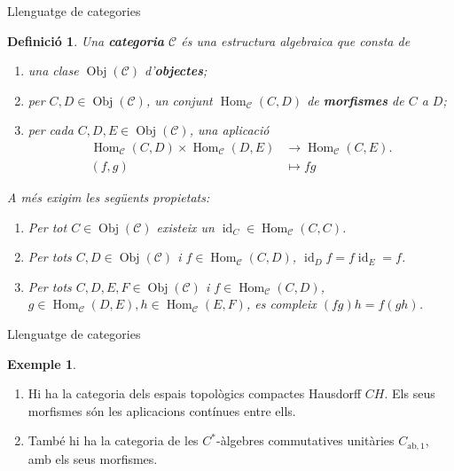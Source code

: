 \documentclass{beamer}
\newtheorem{definicio}{Definici\'{o}}
\theoremstyle{definition}
\newtheorem{exemple}{Exemple}
\DeclareMathOperator{\Obj}{Obj}
\DeclareMathOperator{\Hom}{Hom}
\DeclareMathOperator{\id}{id}
\begin{document}
\begin{frame}{Llenguatge de categories}
\begin{definicio}
Una \textbf{categoria} $\mathcal{C}$ \'{e}s una estructura algebraica que consta de
\begin{enumerate}
\item una clase $\Obj(\mathcal{C})$ d'\textbf{objectes};
\item per $C,D\in\Obj(\mathcal{C})$, un conjunt $\Hom_{\mathcal{C}}(C,D)$ de \textbf{morfismes} de $C$ a $D$;
\item per cada $C,D,E\in\Obj(\mathcal{C})$, una aplicaci\'{o}
\begin{align*}
\Hom_{\mathcal{C}}(C,D)\times\Hom_{\mathcal{C}}(D,E)&\longrightarrow\Hom_{\mathcal{C}}(C,E).\\
(f,g)&\longmapsto fg
\end{align*}
\end{enumerate}
\pause

A m\'{e}s exigim les seg\"{u}ents propietats:
\begin{enumerate}
\item Per tot $C\in\Obj(\mathcal{C})$ existeix un $\id_C\in\Hom_{\mathcal{C}}(C,C)$.
\item Per tots $C,D\in\Obj(\mathcal{C})$ i $f\in\Hom_{\mathcal{C}}(C,D)$, $\id_Df=f\id_E=f$.
\item Per tots $C,D,E,F\in\Obj(\mathcal{C})$ i $f\in\Hom_{\mathcal{C}}(C,D)$, $g\in\Hom_{\mathcal{C}}(D,E),h\in\Hom_{\mathcal{C}}(E,F)$, es compleix $(fg)h=f(gh)$.
\end{enumerate}
\end{definicio}
\end{frame}

\begin{frame}{Llenguatge de categories}
\begin{exemple}
\begin{enumerate}
\item Hi ha la categoria dels espais topol\`{o}gics compactes Hausdorff $CH$. Els seus morfismes s\'{o}n les aplicacions cont\'{i}nues entre ells.
\pause
\item Tamb\'{e} hi ha la categoria de les $C^*$-\`{a}lgebres commutatives unit\`{a}ries $C_{\text{ab},1}$, amb els seus morfismes.
\end{enumerate}
\end{exemple}
\end{frame}
\end{document}
